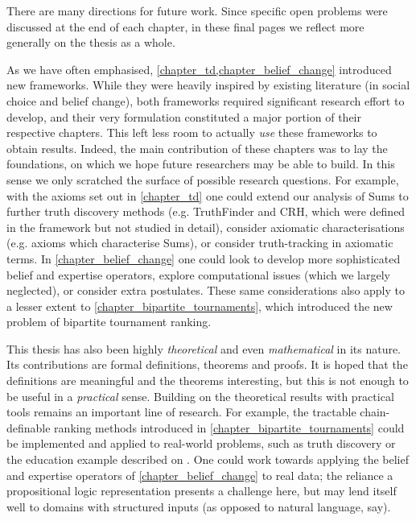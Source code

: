There are many directions for future work. Since specific open problems were
discussed at the end of each chapter, in these final pages we reflect more
generally on the thesis as a whole.

As we have often emphasised, \cref{chapter_td,chapter_belief_change} introduced
new frameworks. While they were heavily inspired by existing literature (in
social choice and belief change), both frameworks required significant research
effort to develop, and their very formulation constituted a major portion of
their respective chapters. This left less room to actually \emph{use} these
frameworks to obtain results. Indeed, the main contribution of these chapters
was to lay the foundations, on which we hope future researchers may be able to
build. In this sense we only scratched the surface of possible research
questions.
%
For example, with the axioms set out in \cref{chapter_td} one could extend our
analysis of Sums to further truth discovery methods (e.g. TruthFinder and CRH,
which were defined in the framework but not studied in detail), consider
axiomatic characterisations (e.g. axioms which characterise Sums), or consider
truth-tracking in axiomatic terms. In \cref{chapter_belief_change} one could
look to develop more sophisticated belief and expertise operators, explore
computational issues (which we largely neglected), or consider extra
postulates. These same considerations also apply to a lesser extent to
\cref{chapter_bipartite_tournaments}, which introduced the new problem of
bipartite tournament ranking.

This thesis has also been highly \emph{theoretical} and even
\emph{mathematical} in its nature. Its contributions are formal definitions,
theorems and proofs. It is hoped that the definitions are meaningful and the
theorems interesting, but this is not enough to be useful in a \emph{practical}
sense. Building on the theoretical results with practical tools remains an
important line of research. For example, the tractable chain-definable ranking
methods introduced in \cref{chapter_bipartite_tournaments} could be implemented
and applied to real-world problems, such as truth discovery or the education
example described on . One could work towards
applying the belief and expertise operators of \cref{chapter_belief_change} to
real data; the reliance a propositional logic representation presents a
challenge here, but may lend itself well to domains with structured inputs (as
opposed to natural language, say).
